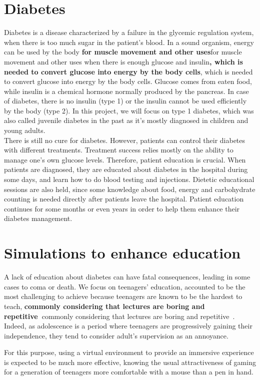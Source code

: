 \documentclass[12pt,MSc]{muthesis}
\newcommand{\warn}[1]{\ifdefined\debug\textbf{#1}\else#1\fi}
\begin{document}
\section{Diabetes}
Diabetes is a disease characterized by a failure in the glycemic regulation system, when there is too much
sugar in the patient's blood. In a sound organism, energy can be used by the body \warn{for muscle movement and other uses} when there is enough glucose and insulin\warn{, which is needed to convert glucose into energy by the body cells}. Glucose comes from eaten food, while insulin is a chemical hormone normally produced by the pancreas. In case of diabetes, there is no insulin (type 1) or the insulin cannot be used efficiently by the body (type 2). In this project, we will focus on type 1 diabetes, which was also called juvenile diabetes in the past as it's mostly diagnosed in children and young adults.\\There is still no cure for diabetes. However, patients can control their diabetes with different treatments. Treatment success relies mostly on the ability to manage one's own glucose levels. Therefore, patient education is crucial. 
When patients are diagnosed, they are educated about diabetes in the hospital during some days, and learn how to do blood testing and injections. Dietetic educational sessions are also held, since some knowledge about food, energy and carbohydrate counting is needed directly after patients leave the hospital. Patient education continues for some months or even years in order to help them enhance their diabetes management.

\section{Simulations to enhance education}
A lack of education about diabetes can have fatal consequences, leading in some cases to coma
or death. We focus on teenagers' education, accounted to be the most challenging to achieve because teenagers are known to be the hardest to teach, \warn{commonly considering that lectures are boring and repetitive~\cite{paulino2011knowing}}. Indeed, as adolescence is a period where teenagers are progressively gaining their independence, they tend to consider adult's supervision as an annoyance.

For this purpose, using a virtual environment to provide an immersive experience is expected to be much more effective, knowing the usual attractiveness of gaming for a generation of teenagers more comfortable with a mouse than a pen in hand. 
\end{document}

